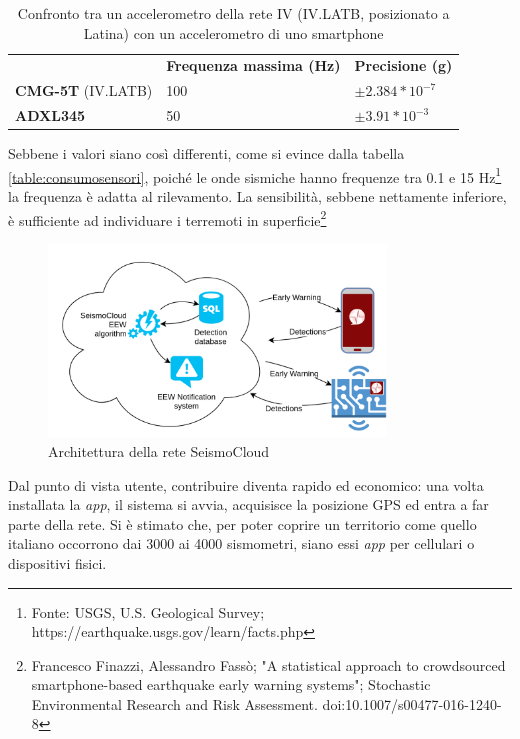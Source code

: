\documentclass[a4paper,10pt]{memoir}
\begin{document}
\begin{table}[h]
\centering
\caption{Confronto tra un accelerometro della rete IV (IV.LATB, posizionato a Latina) con un accelerometro di uno smartphone}
\label{table:datisensori}
\begin{tabular}{lll}
                    & \textbf{Frequenza massima (Hz)} & \textbf{Precisione (g)} \\
\textbf{CMG-5T} (IV.LATB) & 100 & $\pm 2.384 * 10^{-7}$ \\
\textbf{ADXL345}          & 50 & $\pm 3.91 * 10^{-3}$
\end{tabular}
\end{table}

Sebbene i valori siano così differenti, come si evince dalla tabella \ref{table:consumosensori}, poiché le onde sismiche hanno frequenze tra 0.1 e 15 Hz\footnote{Fonte: USGS, U.S. Geological Survey; https://earthquake.usgs.gov/learn/facts.php} la frequenza è adatta al rilevamento. La sensibilità, sebbene nettamente inferiore, è sufficiente ad individuare i terremoti in superficie\footnote{    Francesco Finazzi, Alessandro Fassò; "A statistical approach to crowdsourced smartphone-based earthquake early warning systems"; Stochastic Environmental Research and Risk Assessment.  doi:10.1007/s00477-016-1240-8}

\begin{figure}[ht]
\centering
\label{fig:scsarch}
\caption{Architettura della rete SeismoCloud}
\includegraphics[width=0.8\textwidth]{introduzione/SeismoCloud_arch}
\end{figure}

Dal punto di vista utente, contribuire diventa rapido ed economico: una volta installata la \textit{app}, il sistema si avvia, acquisisce la posizione GPS ed entra a far parte della rete. Si è stimato che, per poter coprire un territorio come quello italiano occorrono dai 3000 ai 4000 sismometri, siano essi \textit{app} per cellulari o dispositivi fisici.
\end{document}
